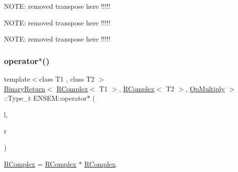 N\+O\+TE\+: removed transpose here !!!!!

N\+O\+TE\+: removed transpose here !!!!!

N\+O\+TE\+: removed transpose here !!!!! \mbox{\label{group__rcomplex_gab6d38d52433e94dc9aedbb69f2463255}} 
\subsubsection{\texorpdfstring{operator$\ast$()}{operator*()}\hspace{0.1cm}{\footnotesize\ttfamily [1/3]}}
{\footnotesize\ttfamily template$<$class T1 , class T2 $>$ \\
\mbox{\hyperlink{structENSEM_1_1BinaryReturn}{Binary\+Return}}$<$ \mbox{\hyperlink{classENSEM_1_1RComplex}{R\+Complex}}$<$ T1 $>$, \mbox{\hyperlink{classENSEM_1_1RComplex}{R\+Complex}}$<$ T2 $>$, \mbox{\hyperlink{structENSEM_1_1OpMultiply}{Op\+Multiply}} $>$\+::Type\+\_\+t E\+N\+S\+E\+M\+::operator$\ast$ (\begin{DoxyParamCaption}\item[{const \mbox{\hyperlink{classENSEM_1_1RComplex}{R\+Complex}}$<$ T1 $>$ \&\+\_\+\+\_\+restrict\+\_\+\+\_\+}]{l,  }\item[{const \mbox{\hyperlink{classENSEM_1_1RComplex}{R\+Complex}}$<$ T2 $>$ \&\+\_\+\+\_\+restrict\+\_\+\+\_\+}]{r }\end{DoxyParamCaption})\hspace{0.3cm}{\ttfamily [inline]}}



\mbox{\hyperlink{classENSEM_1_1RComplex}{R\+Complex}} = \mbox{\hyperlink{classENSEM_1_1RComplex}{R\+Complex}} $\ast$ \mbox{\hyperlink{classENSEM_1_1RComplex}{R\+Complex}}. 

\mbox{\label{group__rcomplex_ga0d32e4173e14565f942b2e42ede11659}} 
